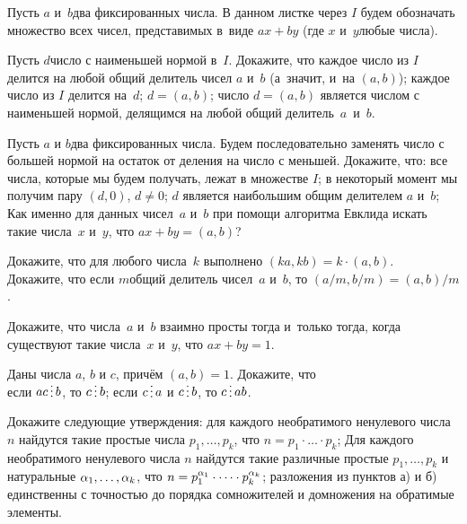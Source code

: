 \documentclass[a4paper,12pt]{article}
\begin{document}
Пусть $a$ и~$b$\т два фиксированных числа.
В данном листке через $I$ будем обозначать множество всех чисел,
представимых в~виде $ax+by$ (где $x$ и~$y$\т любые числа).


\vspace*{-3mm}
\setcounter{problemnum}{10}
Пусть $d$\т число с наименьшей нормой в~$I$. Докажите, что
каждое число из $I$ делится на любой общий делитель чисел $a$ и~$b$ (а~значит, и~на $(a,b)$);
каждое число из $I$ делится на~$d$;
$d=(a,b)$;
число $d=(a,b)$ является числом с наименьшей нормой, делящимся на любой общий делитель~$a$~и~$b$.


\vspace*{-8mm}
Пусть $a$ и $b$\т два фиксированных числа. Будем последовательно заменять число с большей нормой на остаток от деления на число с меньшей. Докажите, что:
все числа, которые мы будем получать, лежат в множестве $I$;
в некоторый момент мы получим пару $(d, 0)$, $d\ne 0$;
$d$ является наибольшим общим делителем $a$ и~$b$;
Как именно для данных чисел~$a$ и~$b$ при помощи алгоритма Евклида искать такие числа~$x$ и~$y$, что $ax+by=(a,b)$?
\vspace*{-3mm}

Докажите, что для любого числа~$k$ выполнено $(ka,kb)=k\cdot(a,b)$.\\
Докажите, что если $m$\т общий делитель чисел~$a$ и~$b$, то $(a/m,b/m)=(a,b)/m$.

Докажите, что числа~$a$ и~$b$ взаимно просты тогда и~только тогда, когда существуют такие числа~$x$ и~$y$, что $ax+by=1$.

Даны числа $a$, $b$ и $c$, причём $(a,b) = 1$. Докажите, что \\
если $ac \dv b$,  то $c \dv b$;
если $c \dv a$ и $c \dv b$,  то $c \dv ab$.

\vspace*{-3mm}
 Докажите следующие утверждения:
 для каждого необратимого ненулевого числа $n$ найдутся такие простые числа
$p_1,\dots,p_k$, что $n=p_1\cdot \dots \cdot  p_k$; %
 Для каждого необратимого ненулевого числа $n$ найдутся такие
различные простые $p_1,\dots,p_k$ и натуральные $\alpha_1,\dots,\alpha_k$, что
$n=p_1^{\alpha_1}\cdot \dots \cdot p_k^{\alpha_k}$; %
 разложения из пунктов а) и б) единственны с точностью до порядка
сомножителей и домножения на обратимые элементы.
\vspace*{-3mm}
\end{document}

